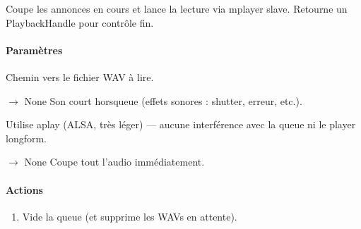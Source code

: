 \documentclass[letterpaper,10pt,french]{sphinxmanual}
\begin{document}
\begin{fulllineitems}
\begin{fulllineitems}
\sphinxAtStartPar
Coupe les annonces en cours et lance la lecture via mplayer slave.
Retourne un PlaybackHandle pour contrôle fin.


\paragraph{Paramètres}
\label{\detokenize{api/core:id5}}\begin{description}
\sphinxAtStartPar
Chemin vers le fichier WAV à lire.

\end{description}

\end{fulllineitems}


\begin{fulllineitems}
\label{\detokenize{api/core:core.speaker.Speaker.play_sound}}
\pysigstartsignatures
\pysiglinewithargsret
{}
{\sphinxparamcomma {}}
{{ $\rightarrow$ None}}
\pysigstopsignatures
\sphinxAtStartPar
Son court hors\sphinxhyphen{}queue (effets sonores : shutter, erreur, etc.).

\sphinxAtStartPar
Utilise aplay (ALSA, très léger) — aucune interférence avec
la queue ni le player long\sphinxhyphen{}form.

\end{fulllineitems}


\begin{fulllineitems}
\label{\detokenize{api/core:core.speaker.Speaker.stop_all_audio}}
\pysigstartsignatures
\pysiglinewithargsret
{}
{}
{{ $\rightarrow$ None}}
\pysigstopsignatures
\sphinxAtStartPar
Coupe tout l’audio immédiatement.


\paragraph{Actions}
\label{\detokenize{api/core:actions}}\begin{enumerate}
%
\item {} 
\sphinxAtStartPar
Vide la queue (et supprime les WAVs en attente).


\end{enumerate}
\end{fulllineitems}
\end{fulllineitems}
\end{document}
